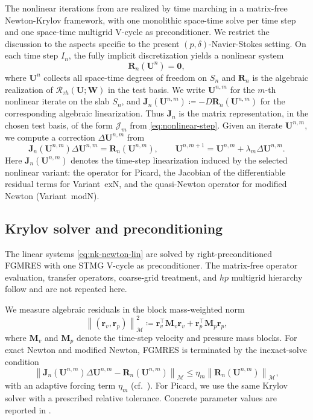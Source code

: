 \documentclass[DIV=16]{scrartcl}
\newcommand{\norm}[1]{\left\lVert #1\right\rVert}
\newcommand{\In}{I_n}
\newcommand{\Sn}{S_n}
\newcommand{\reg}{\delta}
\newcommand{\pn}{p}
\begin{document}
The nonlinear iterations from  are realized by time marching in
a matrix-free Newton-Krylov framework, with one monolithic space-time solve per
time step and one space-time multigrid V-cycle as preconditioner.
We restrict the discussion to the aspects specific to the present
$(\pn,\reg)$-Navier-Stokes setting.
On each time step $\In$, the fully implicit discretization yields a nonlinear
system
\[
  \bm R_n(\bm U^n)=\bm 0,
\]
where $\bm U^n$ collects all space-time degrees of freedom on $\Sn$ and
$\bm R_n$ is the algebraic realization of $\mathcal R_{\tau h}(\bm U;\bm W)$ in
the test basis. We write $\bm U^{n,m}$ for the $m$-th nonlinear iterate on the
slab $\Sn$, and $\bm J_n(\bm U^{n,m})\coloneq -D\bm R_n(\bm U^{n,m})$ for the
corresponding algebraic linearization. Thus $\bm J_n$ is the matrix
representation, in the chosen test basis, of the form
$\mathcal J_m$ from \eqref{eq:nonlinear-step}. Given an iterate $\bm U^{n,m}$, we compute a correction
$\Delta\bm U^{n,m}$ from
\begin{equation}\label{eq:nk-newton-lin}
  \bm J_n(\bm U^{n,m})\Delta\bm U^{n,m}
  = \bm R_n(\bm U^{n,m}),
  \qquad
  \bm U^{n,m+1}=\bm U^{n,m}+\lambda_m\Delta\bm U^{n,m}.
\end{equation}
Here $\bm J_n(\bm U^{n,m})$ denotes the time-step linearization induced by the
selected nonlinear variant: the operator for Picard, the Jacobian of the
differentiable residual terms for Variant~exN, and the quasi-Newton operator for
modified Newton (Variant~modN).

\subsection{Krylov solver and preconditioning}

The linear systems \eqref{eq:nk-newton-lin} are solved by right-preconditioned
FGMRES with one STMG V-cycle as preconditioner.
The matrix-free operator evaluation, transfer operators, coarse-grid treatment,
and $hp$ multigrid hierarchy follow
\cite{MargenbergBause2026MonolithicSTMG,MargenbergMunchBause2025hpMGStokes} and
are not repeated here.

We measure algebraic residuals in the block mass-weighted norm
\[
  \norm{(\bm r_v,\bm r_p)}_{\mathcal M}^2
  \coloneq
  \bm r_v^\top \bm M_v \bm r_v+\bm r_p^\top \bm M_p \bm r_p,
\]
where $\bm M_v$ and $\bm M_p$ denote the time-step velocity and pressure mass blocks.
For exact Newton and modified Newton, FGMRES is terminated by the inexact-solve
condition
\begin{equation}\label{eq:nk-inexact-newton}
  \norm{\bm J_n(\bm U^{n,m})\Delta\bm U^{n,m}-\bm R_n(\bm U^{n,m})}_{\mathcal M}
  \le
  \eta_m \norm{\bm R_n(\bm U^{n,m})}_{\mathcal M},
\end{equation}
with an adaptive forcing term $\eta_m$ (cf.~\cite{MargenbergBause2026MonolithicSTMG}).
For Picard, we use the same Krylov solver with a prescribed relative tolerance.
Concrete parameter values are reported in .
\end{document}
